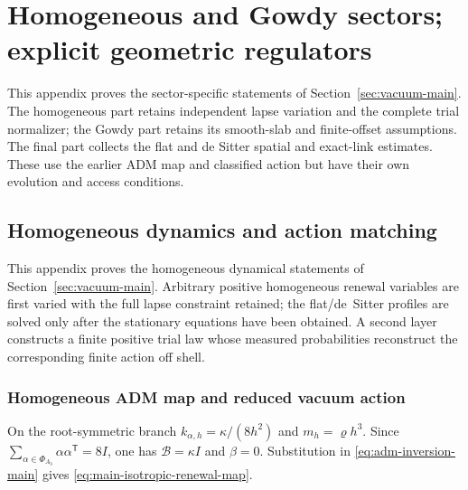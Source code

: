 \documentclass[11pt]{article}
\numberwithin{equation}{section}
\theoremstyle{definition}
\theoremstyle{remark}
\begin{document}
\section{Homogeneous and Gowdy sectors; explicit geometric regulators}
\label{supp:sectors}

This appendix proves the sector-specific statements of
Section~\ref{sec:vacuum-main}. The homogeneous part retains independent
lapse variation and the complete trial normalizer; the Gowdy part retains
its smooth-slab and finite-offset assumptions. The final part collects the
flat and de Sitter spatial and exact-link estimates. These use the earlier
ADM map and classified action but have their own evolution and access
conditions.
\subsection{Homogeneous dynamics and action matching}
\label{supp:homogeneous-dynamics}

This appendix proves the homogeneous dynamical statements of
Section~\ref{sec:vacuum-main}.  Arbitrary positive homogeneous renewal variables
are first varied with the full lapse constraint retained; the flat/de~Sitter
profiles are solved only after the stationary equations have been obtained.  A second layer constructs a finite positive
trial law whose measured probabilities reconstruct the corresponding finite
action off shell.

\subsubsection{Homogeneous ADM map and reduced vacuum action}

On the root-symmetric branch
$k_{\alpha,h}=\kappa/(8h^2)$ and $m_h=\varrho h^3$.  Since
$\sum_{\alpha\in\Phi_{A_3}}\alpha\alpha^{\mathsf T}=8I$, one has
$\mathcal B=\kappa I$ and $\beta=0$.  Substitution in
\eqref{eq:adm-inversion-main} gives
\eqref{eq:main-isotropic-renewal-map}.
\end{document}
